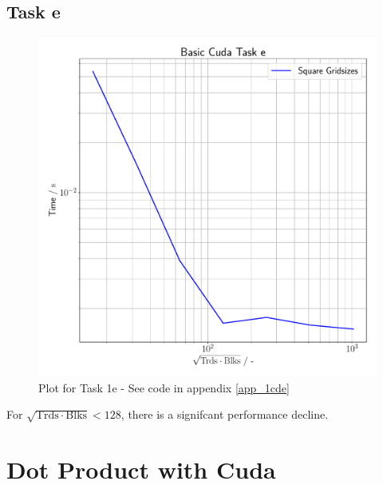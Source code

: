 \subsection{Task e}
\begin{figure}[h]
    \begin{center}
        \includegraphics[width=1\textwidth]{figures/task_1_e.pdf}
        \caption{Plot for Task 1e - See code in appendix \ref{app_1cde}}
        \label{task_1_e_plot}
    \end{center}
\end{figure}
For $\sqrt{\mathrm{Trds} \cdot \mathrm{Blks}} < 128 $, there is a signifcant performance decline.
\pagebreak

\section{Dot Product with Cuda}
